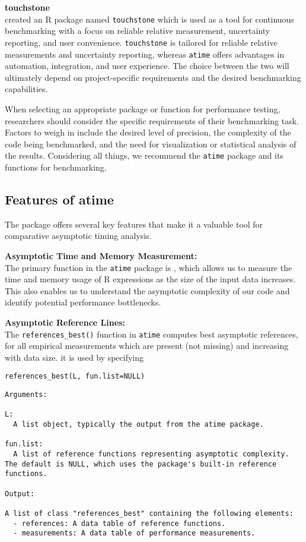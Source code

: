 \textbf{touchstone} \\
\citet{touchstone} created an R package named \texttt{touchstone} which is used as a tool for continuous benchmarking with a focus on reliable relative measurement, uncertainty reporting, and user convenience. \texttt{touchstone} is tailored for reliable relative measurements and uncertainty reporting, whereas \texttt{atime} offers advantages in automation, integration, and user experience. The choice between the two will ultimately depend on project-specific requirements and the desired benchmarking capabilities.

\noindent When selecting an appropriate package or function for performance testing, researchers should consider the specific requirements of their benchmarking task. Factors to weigh in include the desired level of precision, the complexity of the code being benchmarked, and the need for visualization or statistical analysis of the results. Considering all things, we recommend the \texttt{atime} package and its functions for benchmarking.

\subsection{Features of atime}
The package offers several key features that make it a valuable tool for comparative asymptotic timing analysis.

\textbf{Asymptotic Time and Memory Measurement:} \\
The primary function in the \texttt{atime} package is , which allows us to measure the time and memory usage of R expressions as the size of the input data increases. This also enables us to understand the asymptotic complexity of our code and identify potential performance bottlenecks.
\vspace{0.1in}

\textbf{Asymptotic Reference Lines:} \\
The \texttt{references\_best()} function in \texttt{atime} computes best asymptotic references, for all empirical measurements which are present (not missing) and increasing with data size. it is used by specifying

\texttt{references\_best(L, fun.list=NULL)}

\begin{lstlisting}
Arguments:

L: 
  A list object, typically the output from the atime package.

fun.list: 
  A list of reference functions representing asymptotic complexity. The default is NULL, which uses the package's built-in reference functions.

Output:

A list of class "references_best" containing the following elements:
  - references: A data table of reference functions.
  - measurements: A data table of performance measurements.
  
\end{lstlisting}


